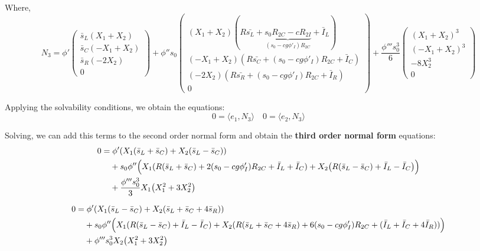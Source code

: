 \documentclass[ENG]{fancynotes}
\begin{document}
Where, 
\[
N_3 = 
\phi'\begin{pmatrix}
\bar{s}_L(X_1+X_2)\\
\bar{s}_C(-X_1+X_2)\\ 
\bar{s}_R(-2X_2)\\ 
0
\end{pmatrix} +\phi''s_0\begin{pmatrix}
(X_1+X_2)(R\bar{s_L} + \underbrace{s_0R_{2C} - cR_{2I}}_{(s_0-cg\phi'_I)R_{2C}}+ \bar{I}_L)\\
(-X_1+X_2)(R\bar{s_C} +(s_0-cg\phi'_I)R_{2C}+ \bar{I}_C)\\ 
(-2X_2)(R\bar{s_R} +(s_0-cg\phi'_I)R_{2C} + \bar{I}_R)\\ 
0
\end{pmatrix} + \frac{\phi'''s_0^3}{6} 
\begin{pmatrix}
(X_1 + X_2)^3\\  
(-X_1 + X_2)^3\\  
-8X_2^3 \\ 
 0
\end{pmatrix}
\]

Applying the solvability conditions, we obtain the equations:
\begin{equation}
0 = \langle e_1, N_3\rangle \quad 0 = \langle e_2, N_3 \rangle
\end{equation}

Solving, we can add this terms to the second order normal form and obtain the \textbf{third order normal form} equations: 
\begin{equation}
\begin{aligned}
0 = & \; \phi'(X_1(\bar{s}_L+ \bar{s}_C)+X_2(\bar{s}_L -\bar{s}_C))\\
&+ s_0 \phi'' \Bigl( X_1(R(\bar{s}_L+\bar{s}_C)+2(s_0-cg\phi'_I)R_{2C}   + \bar{I}_L + \bar{I}_C)  + X_2\bigl(R(\bar{s}_L-\bar{s}_C) + \bar{I}_L - \bar{I}_C\bigr)\Bigr)\\
&+ \frac{\phi'''s_0^3}{3}  X_1\bigl(X_1^2+3X_2^2\bigr)
\end{aligned}
\end{equation}


\begin{equation}
\begin{aligned}
0 = &\; \phi'(X_1(\bar{s}_L- \bar{s}_C)+X_2(\bar{s}_L +\bar{s}_C+4\bar{s}_R))\\ 
& + s_0\phi'' \Bigl(X_1(R(\bar{s}_L-\bar{s}_C) + \bar{I}_L - \bar{I}_C) + X_2(R(\bar{s}_L+\bar{s}_C+ 4\bar{s}_R)+ 6(s_0-cg\phi'_I)R_{2C}  + (\bar{I}_L + \bar{I}_C + 4\bar{I}_R))\Bigr)\\
&+ \phi'''s_0^3 X_2\bigl(X_1^2+3X_2^2\bigr)
\end{aligned}
\end{equation}
\end{document}
